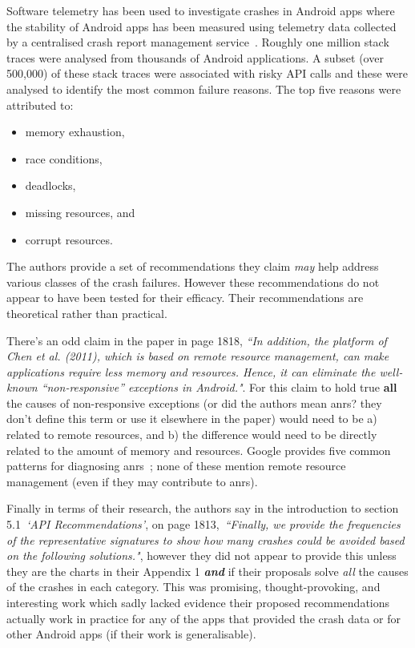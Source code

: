 Software telemetry has been used to investigate crashes in Android apps where the stability of Android apps has been measured using telemetry data collected by a centralised crash report management service~. Roughly one million stack traces were analysed from thousands of Android applications. A subset (over 500,000) of these stack traces were associated with risky API calls and these were analysed to identify the most common failure reasons. The top five reasons were attributed to:

\begin{itemize}
    \item memory exhaustion,
    \item race conditions,
    \item deadlocks,
    \item missing resources, and
    \item corrupt resources.
\end{itemize}
    
The authors provide a set of recommendations they claim \emph{may} help address various classes of the crash failures. However these recommendations do not appear to have been tested for their efficacy. Their recommendations are theoretical rather than practical. 

There's an odd claim in the paper in page 1818, \emph{``In addition, the platform of Chen et al. (2011), which is based on remote resource management, can make applications require less memory and resources. Hence, it can eliminate the well-known “non-responsive” exceptions in Android."}. For this claim to hold true \textbf{all} the causes of non-responsive exceptions (or did the authors mean \glspl{anr}? they don't define this term or use it elsewhere in the paper) would need to be a) related to remote resources, and b) the difference would need to be directly related to the amount of memory and resources. Google provides five common patterns for diagnosing \glspl{anr}~; none of these mention remote resource management (even if they may contribute to \glspl{anr}). 

Finally in terms of their research, the authors say in the introduction to section 5.1~\emph{`API Recommendations'}, on page 1813,~\emph{``Finally, we provide the frequencies of the representative signatures to show how many crashes could be avoided based on the following solutions."}, however they did not appear to provide this unless they are the charts in their Appendix 1 \textbf{\emph{and}} if their proposals solve \emph{all} the causes of the crashes in each category. This was promising, thought-provoking, and interesting work which sadly lacked evidence their proposed recommendations actually work in practice for any of the apps that provided the crash data or for other Android apps (if their work is generalisable).


